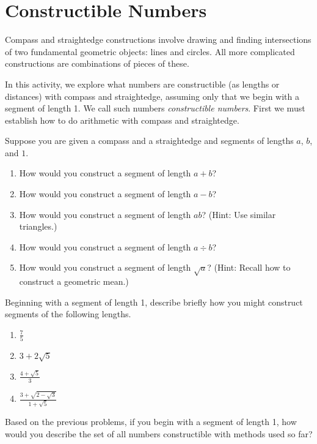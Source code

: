 \newpage
\section{Constructible Numbers}
Compass and straightedge constructions involve drawing and finding intersections of two fundamental geometric objects:  lines and circles.  All more complicated constructions are combinations of pieces of these.  

In this activity, we explore what numbers are constructible (as lengths or distances) with compass and straightedge, assuming only that we begin with a segment of length 1.  We call such numbers \textit{constructible numbers}.  First we must establish how to do arithmetic with compass and straightedge.  
\begin{prob}
Suppose you are given a compass and a straightedge and segments of lengths $a$, $b$, and $1$.  
\begin{enumerate}
\item How would you construct a segment of length $a+b$? 
\item How would you construct a segment of length $a-b$? 
\item How would you construct a segment of length $ab$?  (Hint:  Use similar triangles.)  
\item How would you construct a segment of length $a\div b$? 
\item How would you construct a segment of length $\sqrt{a}$?  (Hint: Recall how to construct a geometric mean.)  
\end{enumerate}
\end{prob}

\begin{prob}
Beginning with a segment of length 1, describe briefly how you might construct segments of the following lengths.
\begin{enumerate}
\item $\frac{7}{5}$
\item $3+2\sqrt{5}$
\item $\frac{4+\sqrt{5}}{3}$
\item $\frac{3 + \sqrt{2-\sqrt{3}}}{1+\sqrt{5}}$
\end{enumerate}
\end{prob}

\begin{prob}
Based on the previous problems, if you begin with a segment of length 1, how would you describe the set of all numbers constructible with methods used so far?    
\end{prob}

